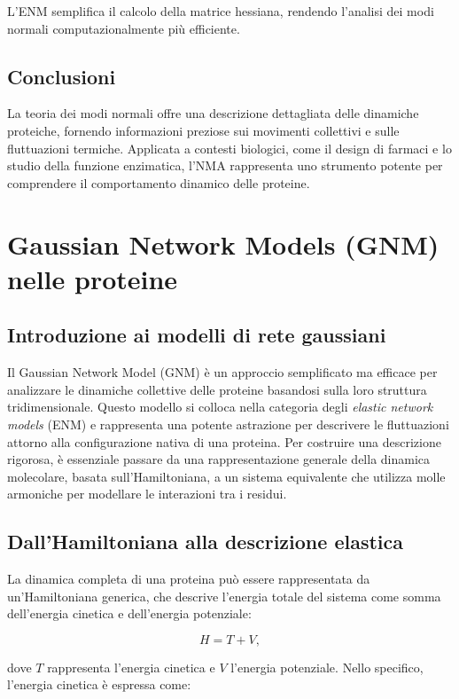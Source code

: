 \documentclass[Lau,binding=0.6cm,oneside,noexaminfo]{sapthesis}
\begin{document}
L’ENM semplifica il calcolo della matrice hessiana, rendendo l’analisi dei modi normali computazionalmente più efficiente.

\section{Conclusioni}
La teoria dei modi normali offre una descrizione dettagliata delle dinamiche proteiche, fornendo informazioni preziose sui movimenti collettivi e sulle fluttuazioni termiche. Applicata a contesti biologici, come il design di farmaci e lo studio della funzione enzimatica, l'NMA rappresenta uno strumento potente per comprendere il comportamento dinamico delle proteine.
\chapter{Gaussian Network Models (GNM) nelle proteine}

\section*{Introduzione ai modelli di rete gaussiani}
Il Gaussian Network Model (GNM) è un approccio semplificato ma efficace per analizzare le dinamiche collettive delle proteine basandosi sulla loro struttura tridimensionale. Questo modello si colloca nella categoria degli \textit{elastic network models} (ENM) e rappresenta una potente astrazione per descrivere le fluttuazioni attorno alla configurazione nativa di una proteina. Per costruire una descrizione rigorosa, è essenziale passare da una rappresentazione generale della dinamica molecolare, basata sull'Hamiltoniana, a un sistema equivalente che utilizza molle armoniche per modellare le interazioni tra i residui.

\section{Dall’Hamiltoniana alla descrizione elastica}
La dinamica completa di una proteina può essere rappresentata da un'Hamiltoniana generica, che descrive l'energia totale del sistema come somma dell'energia cinetica e dell'energia potenziale:

\begin{equation}
H = T + V,
\end{equation}

dove $T$ rappresenta l'energia cinetica e $V$ l'energia potenziale. Nello specifico, l'energia cinetica è espressa come:
\end{document}
